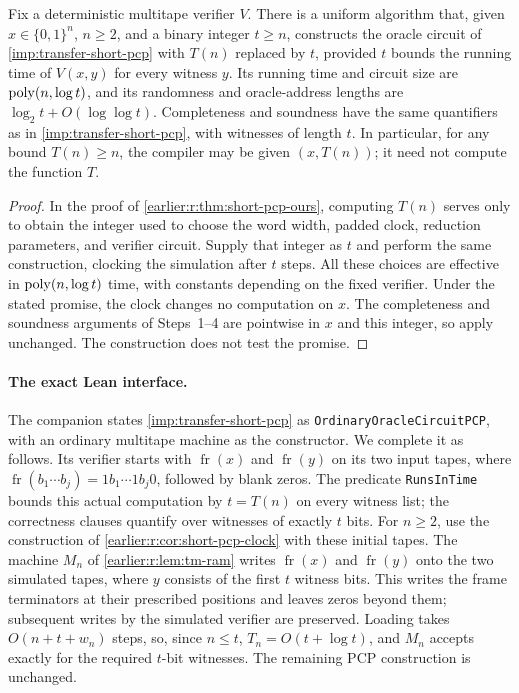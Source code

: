 \begin{corollary}\label{earlier:r:cor:short-pcp-clock}
Fix a deterministic multitape verifier \(V\). There is a uniform
algorithm that, given \(x\in\{0,1\}^n\), \(n\ge2\), and a binary integer
\(t\ge n\), constructs the oracle circuit of
\cref{imp:transfer-short-pcp} with \(T(n)\) replaced by \(t\), provided \(t\)
bounds the running time of \(V(x,y)\) for every witness \(y\).
Its running time and circuit size are \(\operatorname{poly}(n,\log t)\), and its
randomness and oracle-address lengths are
\(\log_2t+O(\log\log t)\). Completeness and soundness have the same
quantifiers as in \cref{imp:transfer-short-pcp}, with witnesses of length \(t\).
In particular, for any bound \(T(n)\ge n\), the compiler may be given
\((x,T(n))\); it need not compute the function \(T\).
\end{corollary}
\begin{proof}
In the proof of \cref{earlier:r:thm:short-pcp-ours}, computing \(T(n)\) serves
only to obtain the integer used to choose the word width, padded
clock, reduction parameters, and verifier circuit. Supply that integer
as \(t\) and perform the same construction, clocking the simulation
after \(t\) steps. All these choices are effective in
\(\operatorname{poly}(n,\log t)\) time, with constants depending on the fixed
verifier. Under the stated promise, the clock changes no computation
on \(x\). The completeness and soundness arguments of Steps~1--4
are pointwise in \(x\) and this integer, so apply unchanged. The
construction does not test the promise.
\end{proof}

\paragraph{The exact Lean interface.}
The companion states \cref{imp:transfer-short-pcp} as
\texttt{Ordinary\allowbreak{}Oracle\allowbreak{}Circuit\allowbreak{}PCP}, with an ordinary multitape
machine as the constructor. We complete it as follows. Its verifier starts with
\(\operatorname{fr}(x)\) and \(\operatorname{fr}(y)\) on its two input
tapes, where
\(\operatorname{fr}(b_1\cdots b_j)=1b_1\cdots1b_j0\), followed by blank
zeros. The predicate \texttt{RunsInTime} bounds this actual computation
by \(t=T(n)\) on every witness list; the correctness clauses quantify
over witnesses of exactly \(t\) bits. For \(n\ge2\), use the construction
of \cref{earlier:r:cor:short-pcp-clock} with these initial tapes. The machine
\(M_n\) of \cref{earlier:r:lem:tm-ram} writes \(\operatorname{fr}(x)\) and
\(\operatorname{fr}(y)\) onto the two simulated tapes, where \(y\)
consists of the first \(t\) witness bits. This writes the frame
terminators at their prescribed positions and leaves zeros beyond them;
subsequent writes by the simulated verifier are preserved. Loading takes
\(O(n+t+w_n)\) steps, so, since \(n\le t\), \(T_n=O(t+\log t)\), and
\(M_n\) accepts exactly for the required \(t\)-bit witnesses. The
remaining PCP construction is unchanged.

